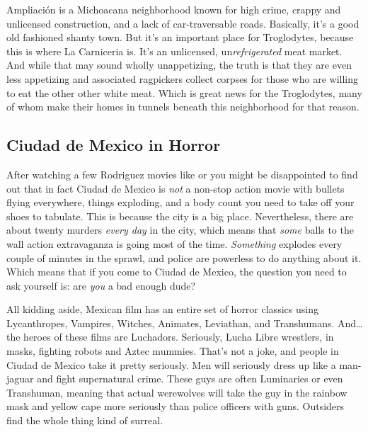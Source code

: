 Ampliaci\'{o}n is a Michoacana neighborhood known for high crime, crappy and unlicensed construction, and a lack of car-traversable roads. Basically, it's a good old fashioned shanty town. But it's an important place for Troglodytes, because this is where La Carniceria is. It's an unlicensed, un\textit{refrigerated} meat market. And while that may sound wholly unappetizing, the truth is that they are even less appetizing and associated ragpickers collect corpses for those who are willing to eat the other other white meat. Which is great news for the Troglodytes, many of whom make their homes in tunnels beneath this neighborhood for that reason.

\subsection{Ciudad de Mexico in Horror}

\hspace{\parindent} After watching a few Rodriguez movies like  or  you might be disappointed to find out that in fact Ciudad de Mexico is \textit{not} a non-stop action movie with bullets flying everywhere, things exploding, and a body count you need to take off your shoes to tabulate. This is because the city is a big place. Nevertheless, there are about twenty murders \textit{every day} in the city, which means that \textit{some} balls to the wall action extravaganza is going most of the time. \textit{Something} explodes every couple of minutes in the sprawl, and police are powerless to do anything about it. Which means that if you come to Ciudad de Mexico, the question you need to ask yourself is: are \textit{you} a bad enough dude?

All kidding aside, Mexican film has an entire set of horror classics using Lycanthropes, Vampires, Witches, Animates, Leviathan, and Transhumans. And\ldots{} the heroes of these films are Luchadors. Seriously, Lucha Libre wrestlers, in masks, fighting robots and Aztec mummies. That's not a joke, and people in Ciudad de Mexico take it pretty seriously. Men will seriously dress up like a man-jaguar and fight supernatural crime. These guys are often Luminaries or even Transhuman, meaning that actual werewolves will take the guy in the rainbow mask and yellow cape more seriously than police officers with guns. Outsiders find the whole thing kind of surreal.

